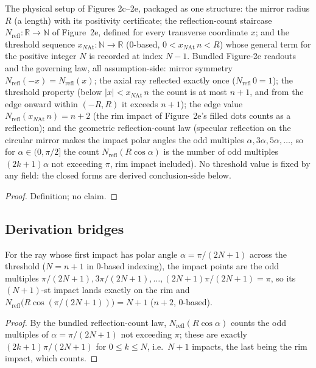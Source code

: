 \begin{definition}
\label{def:IPhO2026Problems_problem_IPhO_2026_2_A_1:HalfCylindricalMirror}
The physical setup of Figures 2c--2e, packaged as one structure: the mirror
radius $R$ (a length) with its positivity certificate; the reflection-count
staircase $N_{\mathrm{refl}} : \mathbb{R} \to \mathbb{N}$ of Figure~2e, defined
for every transverse coordinate $x$; and the threshold sequence
$x_{N\mathrm{At}} : \mathbb{N} \to \mathbb{R}$ ($0$-based, $0 < x_{N\mathrm{At}}\,n < R$)
whose general term for the positive integer $N$ is recorded at index $N - 1$.
Bundled Figure-2e readouts and the governing law, all assumption-side:
mirror symmetry $N_{\mathrm{refl}}(-x) = N_{\mathrm{refl}}(x)$; the axial ray
reflected exactly once ($N_{\mathrm{refl}}\,0 = 1$); the threshold property
(below $|x| < x_{N\mathrm{At}}\,n$ the count is at most $n + 1$, and from the
edge onward within $(-R, R)$ it exceeds $n + 1$); the edge value
$N_{\mathrm{refl}}(x_{N\mathrm{At}}\,n) = n + 2$ (the rim impact of
Figure~2e's filled dots counts as a reflection); and the geometric
reflection-count law (specular reflection on the circular mirror makes the
impact polar angles the odd multiples $\alpha, 3\alpha, 5\alpha, \dots$, so
for $\alpha \in (0, \pi/2]$ the count $N_{\mathrm{refl}}(R\cos\alpha)$ is the
number of odd multiples $(2k+1)\alpha$ not exceeding $\pi$, rim impact
included).  No threshold value is fixed by any field: the closed forms are
derived conclusion-side below.
\end{definition}
\begin{proof}
Definition; no claim.
\end{proof}

\subsection*{Derivation bridges}

\begin{theorem}
\label{thm:IPhO2026Problems_problem_IPhO_2026_2_A_1:limiting_ray_reflection_count}
For the ray whose first impact has polar angle $\alpha = \pi/(2N+1)$ across
the threshold ($N = n + 1$ in $0$-based indexing), the impact points are the
odd multiples $\pi/(2N+1), 3\pi/(2N+1), \dots, (2N+1)\pi/(2N+1) = \pi$, so
its $(N+1)$-st impact lands exactly on the rim and
$N_{\mathrm{refl}}\bigl(R\cos(\pi/(2N+1))\bigr) = N + 1$ ($n + 2$, $0$-based).
\end{theorem}
\begin{proof}
By the bundled reflection-count law, $N_{\mathrm{refl}}(R\cos\alpha)$ counts
the odd multiples of $\alpha = \pi/(2N+1)$ not exceeding $\pi$; these are
exactly $(2k+1)\pi/(2N+1)$ for $0 \le k \le N$, i.e.\ $N + 1$ impacts, the
last being the rim impact, which counts.
\end{proof}

